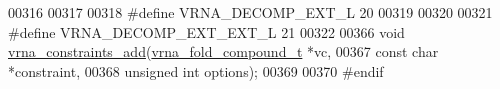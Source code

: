 \begin{DoxyCode}
00316 
00317 
00318 \textcolor{preprocessor}{#define VRNA\_DECOMP\_EXT\_L         20}
00319 
00320 
00321 \textcolor{preprocessor}{#define VRNA\_DECOMP\_EXT\_EXT\_L     21}
00322 
00366 \textcolor{keywordtype}{void} \hyperlink{group__constraints_ga35a401f680969a556858a8dd5f1d07cc}{vrna\_constraints\_add}(\hyperlink{group__fold__compound_structvrna__fc__s}{vrna\_fold\_compound\_t} *vc,
00367                           \textcolor{keyword}{const} \textcolor{keywordtype}{char} *constraint,
00368                           \textcolor{keywordtype}{unsigned} \textcolor{keywordtype}{int} options);
00369 
00370 \textcolor{preprocessor}{#endif}
\end{DoxyCode}
